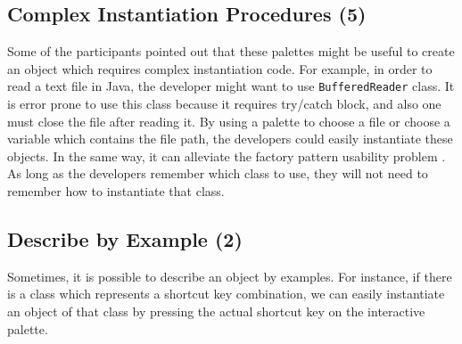 \documentclass[conference]{IEEEtran}
\begin{document}
%	

\subsection{Complex Instantiation Procedures (5)}
Some of the participants pointed out that these palettes might be useful to create an object which requires complex instantiation code. For example, in order to read a text file in Java, the developer might want to use \texttt{BufferedReader} class. It is error prone to use this class because it requires try/catch block, and also one must close the file after reading it. By using a palette to choose a file or choose a variable which contains the file path, the developers could easily instantiate these objects. In the same way, it can alleviate the factory pattern usability problem \cite{ellis_factory_2007}. As long as the developers remember which class to use, they will not need to remember how to instantiate that class.


\subsection{Describe by Example (2)}
Sometimes, it is possible to describe an object by examples. For instance, if there is a class which represents a shortcut key combination, we can easily instantiate an object of that class by pressing the actual shortcut key on the interactive palette.

%	
\end{document}
